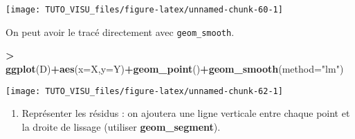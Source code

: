 \documentclass[]{article}
\newenvironment{Shaded}{\begin{snugshade}}{\end{snugshade}}
\newcommand{\DataTypeTok}[1]{\textcolor[rgb]{0.13,0.29,0.53}{#1}}
\newcommand{\DecValTok}[1]{\textcolor[rgb]{0.00,0.00,0.81}{#1}}
\newcommand{\KeywordTok}[1]{\textcolor[rgb]{0.13,0.29,0.53}{\textbf{#1}}}
\newcommand{\NormalTok}[1]{#1}
\newcommand{\OperatorTok}[1]{\textcolor[rgb]{0.81,0.36,0.00}{\textbf{#1}}}
\newcommand{\StringTok}[1]{\textcolor[rgb]{0.31,0.60,0.02}{#1}}
\providecommand{\tightlist}{%
  \setlength{\itemsep}{0pt}\setlength{\parskip}{0pt}}
\theoremstyle{definition}
\theoremstyle{definition}
\theoremstyle{definition}
\theoremstyle{remark}
\begin{document}
\begin{Shaded}
\end{Shaded}

\begin{center}\texttt{[image: TUTO\_VISU\_files/figure-latex/unnamed-chunk-60-1]} \end{center}

On peut avoir le tracé directement avec \texttt{geom\_smooth}.

\begin{Shaded}
\begin{Highlighting}[]
\OperatorTok{>}\StringTok{ }\KeywordTok{ggplot}\NormalTok{(D)}\OperatorTok{+}\KeywordTok{aes}\NormalTok{(}\DataTypeTok{x=}\NormalTok{X,}\DataTypeTok{y=}\NormalTok{Y)}\OperatorTok{+}\KeywordTok{geom_point}\NormalTok{()}\OperatorTok{+}\KeywordTok{geom_smooth}\NormalTok{(}\DataTypeTok{method=}\StringTok{"lm"}\NormalTok{)}
\end{Highlighting}
\end{Shaded}

\begin{center}\texttt{[image: TUTO\_VISU\_files/figure-latex/unnamed-chunk-62-1]} \end{center}

\begin{enumerate}
\def\labelenumi{\arabic{enumi}.}
\setcounter{enumi}{2}
\tightlist
\item
  Représenter les résidus : on ajoutera une ligne verticale entre chaque point et la droite de lissage (utiliser \textbf{geom\_segment}).
\end{enumerate}
\end{document}
